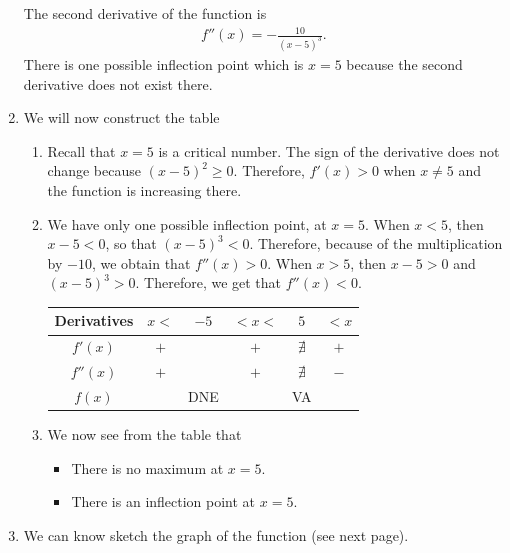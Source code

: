 \begin{enumerate}[label=\textbf{\Alph*.}]
	The second derivative of the function is
		\begin{align*}
		f''(x) = -\frac{10}{(x - 5)^3} .
		\end{align*}
	There is one possible inflection point which is $x = 5$ because the second derivative does not exist there.
	\item We will now construct the table
		\begin{enumerate}
		\item Recall that $x = 5$ is a critical number. The sign of the derivative does not change because $(x - 5)^2 \geq 0$. Therefore, $f'(x) > 0$ when $x \neq 5$ and the function is increasing there.
		\item We have only one possible inflection point, at $x = 5$. When $x < 5$, then $x - 5 < 0$, so that $(x - 5)^3 < 0$. Therefore, because of the multiplication by $-10$, we obtain that $f''(x) > 0$. When $x > 5$, then $x - 5 > 0$ and $(x - 5)^3 > 0$. Therefore, we get that $f''(x) < 0$. 
		\renewcommand{\arraystretch}{1.5}
		\begin{center}
		\begin{tabular}{c||c|c|c|c|c}
		Derivatives & \phantom{22} $x < $ \phantom{22} & $-5$ & \phantom{22} $< x < $ \phantom{22} & $5$ & \phantom{22} $< x$ \phantom{22} \\\hline
		$f'(x)$ & $+$ &  & $+$ & $\nexists$ & $+$ \\
		$f''(x)$ & $+$ &  & $+$ & $\nexists$ & $-$ \\\hline
		$f(x)$ & \CVupInc & DNE & \CVupInc & VA & \CVdownInc
		\end{tabular}
		\end{center}
	\item We now see from the table that
		\begin{itemize}
		\item There is no maximum at $x = 5$.
		\item There is an inflection point at $x = 5$.
		\end{itemize}
		\end{enumerate}
	\item We can know sketch the graph of the function (see next page).
		\begin{center}
		\centering

\end{center}
\end{enumerate}
